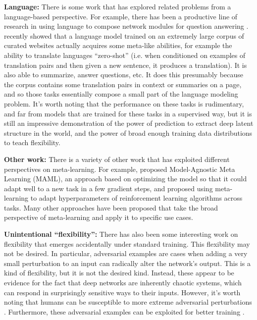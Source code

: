\documentclass[11pt]{article}
\begin{document}
\textbf{Language:} There is some work that has explored related problems from a language-based perspective. For example, there has been a productive line of research in using language to compose network modules for question answering \citep{Andreas, Andreasa}. \citet{Radford2019} recently showed that a language model trained on an extremely large corpus of curated websites actually acquires some meta-like abilities, for example the ability to translate languages ``zero-shot'' (i.e. when conditioned on examples of translation pairs and then given a new sentence, it produces a translation). It is also able to summarize, answer questions, etc. It does this presumably because the corpus contains some translation pairs in context or summaries on a page, and so those tasks essentially compose a small part of the language modeling problem. It's worth noting that the performance on these tasks is rudimentary, and far from models that are trained for these tasks in a supervised way, but it is still an impressive demonstration of the power of prediction to extract deep latent structure in the world, and the power of broad enough training data distributions to teach flexibility. \par  
\textbf{Other work:} There is a variety of other work that has exploited different perspectives on meta-learning. For example, \citet{Finn2017a} proposed Model-Agnostic Meta Learning (MAML), an approach based on optimizing the model so that it could adapt well to a new task in a few gradient steps, and \citet{Xu2018} proposed using meta-learning to adapt hyperparameters of reinforcement learning algorithms across tasks. Many other approaches have been proposed that take the broad perspective of meta-learning and apply it to specific use cases. \par
\textbf{Unintentional ``flexibility'':} There has also been some interesting work on flexibility that emerges accidentally under standard training. This flexibility may not be desired. In particular, adversarial examples \citep{SzegedyAdv} are cases when adding a very small perturbation to an input can radically alter the network's output. This is a kind of flexibility, but it is not the desired kind. Instead, these appear to be evidence for the fact that deep networks are inherently chaotic systems, which can respond in surprisingly sensitive ways to their inputs. However, it's worth noting that humans can be susceptible to more extreme adversarial perturbations \citep{Elsayed2018}. Furthermore, these adversarial examples can be exploited for better training \citep{Goodfellow2015}. \par 
\end{document}
